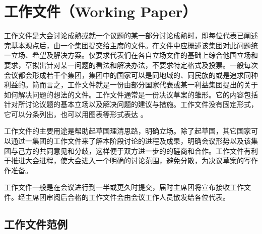 \documentclass[a4paper,openany]{book}
\begin{document}
\newpage

\section{工作文件（Working Paper）}

工作文件是大会讨论成熟或就一个议题的某一部分讨论成熟时，即每位代表已阐述完基本观点后，由一个集团提交给主席的文件。在文件中应概述该集团对此问题统一立场、希望及解决方案。仅要求代表们在各自立场文件的基础上综合他国立场和要求，草拟出针对某一问题的看法和解决办法，不要求特定格式及投票。一般每次会议都会形成若干个集团，集团中的国家可以是同地域的、同民族的或是追求同种利益的。简而言之，工作文件就是一份由部分国家代表或某一利益集团提出的关于如何解决问题的想法的文件。工作文件通常是一份决议草案的雏形。它的内容包括针对所讨论议题的基本立场以及解决问题的建议与措施。工作文件没有固定形式，它可以分条列出，也可以用图表等形式表达 。

工作文件的主要用途是帮助起草国理清思路，明确立场。除了起草国，其它国家可以通过一集团的工作文件来了解本阶段讨论的进程及成果，明确会议形势以及该集团与己方的共同意见和分歧，这样便于双方进一步的的磋商和合作。工作文件有利于推进大会进程，使大会进入一个明确的讨论范围，避免分散，为决议草案的写作作准备。

工作文件一般是在会议进行到一半或更久时提交，届时主席团将宣布接收工作文件。经主席团审阅后合格的工作文件会由会议工作人员散发给各位代表。

\subsection{工作文件范例}

\vspace{1em}
\end{document}
